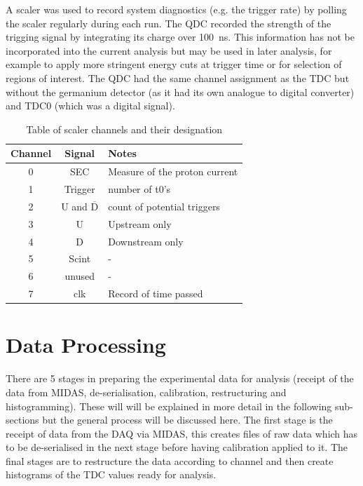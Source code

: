 A scaler was used to record system diagnostics (e.g. the trigger rate) by polling the scaler regularly during each run. The QDC recorded the strength of the trigging signal by integrating its charge over 100~ns. This information has not be incorporated into the current analysis but may be used in later analysis, for example to apply more stringent energy cuts at trigger time or for selection of regions of interest. The QDC had the same channel assignment as the TDC but without the germanium detector (as it had its own analogue to digital converter) and TDC0 (which was a digital signal).
\begin{table}
    \centering
    \begin{tabular}{c|c|l}
        Channel & Signal & Notes\\
        \hline
        0 & SEC & Measure of the proton current\\
        1 & Trigger & number of t0's\\
        2 & U and $\overline{\text{D}}$ & count of potential triggers\\
        3 & U & Upstream only\\
        4 & D & Downstream only\\
        5 & Scint & -\\
        6 & unused & -\\
        7 & clk & Record of time passed\\
    \end{tabular}
    \caption{Table of scaler channels and their designation}
    \label{tab:scaler_chs}
\end{table}

\section{Data Processing} %
\label{sec:run_data}
There are 5 stages in preparing the experimental data for analysis (receipt of the data from MIDAS, de-serialisation, calibration, restructuring and histogramming). These will will be explained in more detail in the following sub-sections but the general process will be discussed here. The first stage is the receipt of data from the DAQ via MIDAS, this creates files of raw data which has to be de-serialised in the next stage before having calibration applied to it. The final stages are to restructure the data according to channel and then create histograms of the TDC values ready for analysis. 

